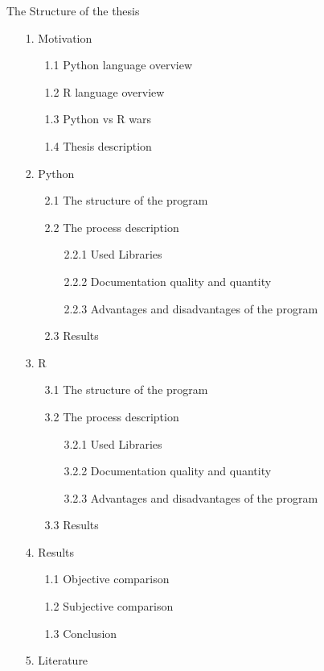 \documentclass{article}
\begin{document}
The Structure of the thesis
\begin{enumerate}
    \item[1.] Motivation
        \begin{enumerate}
            \item[1.1] Python language overview
            \item[1.2] R language overview
            \item[1.3] Python vs R wars
            \item[1.4] Thesis description
        \end{enumerate}
    \item[2.] Python
        \begin{enumerate}
            \item[2.1] The structure of the program
            \item[2.2] The process description
            \begin{enumerate}
                \item[2.2.1] Used Libraries
                \item[2.2.2] Documentation quality and quantity
                \item[2.2.3] Advantages and disadvantages of the program 
            \end{enumerate}
            \item[2.3] Results
        \end{enumerate}
    \item[3.] R
        \begin{enumerate}
            \item[3.1] The structure of the program
            \item[3.2] The process description
            \begin{enumerate}
                \item[3.2.1] Used Libraries
                \item[3.2.2] Documentation quality and quantity
                \item[3.2.3] Advantages and disadvantages of the program 
            \end{enumerate}
            \item[3.3] Results
        \end{enumerate}
    \item[4.] Results
        \begin{enumerate}
            \item[1.1] Objective comparison
            \item[1.2] Subjective comparison
            \item[1.3] Conclusion
        \end{enumerate}
    \item[5.] Literature
\end{enumerate}
\end{document}
